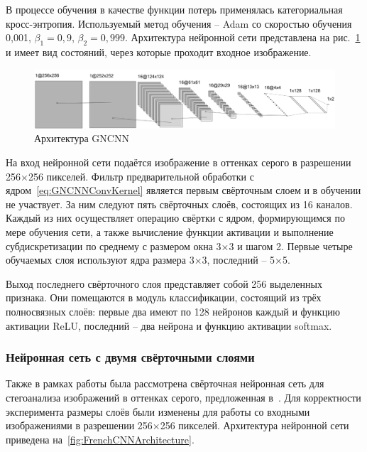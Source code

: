 В процессе обучения в качестве функции потерь применялась категориальная кросс-энтропия. Используемый метод обучения – Adam со скоростью обучения 0,001, $ \beta_1 = 0,9 $, $ \beta_2 = 0,999 $. Архитектура нейронной сети представлена на рис.~\ref{fig:GNCNNArchitecture} и имеет вид состояний, через которые проходит входное изображение.

\begin{figure}
\centering
\includegraphics[width=1\textwidth]{include/graphics/im_3-gncnn_architecture}
\caption{Архитектура GNCNN}
\label{fig:GNCNNArchitecture}
\end{figure}

На вход нейронной сети подаётся изображение в оттенках серого в разрешении 256×256 пикселей. Фильтр предварительной обработки с ядром~\eqref{eq:GNCNNConvKernel} является первым свёрточным слоем и в обучении не участвует. За ним следуют пять свёрточных слоёв, состоящих из 16 каналов. Каждый из них осуществляет операцию свёртки с ядром, формирующимся по мере обучения сети, а также вычисление функции активации и выполнение субдискретизации по среднему с размером окна 3×3 и шагом 2. Первые четыре обучаемых слоя используют ядра размера 3×3, последний – 5×5.

Выход последнего свёрточного слоя представляет собой 256 выделенных признака. Они помещаются в модуль классификации, состоящий из трёх полносвязных слоёв: первые два имеют по 128 нейронов каждый и функцию активации ReLU, последний – два нейрона и функцию активации softmax.

\subsubsection{Нейронная сеть с двумя свёрточными слоями}
Также в рамках работы была рассмотрена свёрточная нейронная сеть для стегоанализа изображений в оттенках серого, предложенная в~\cite{FrenchCNN}. Для корректности эксперимента размеры слоёв были изменены для работы со входными изображениями в разрешении 256×256 пикселей. Архитектура нейронной сети приведена на~\ref{fig:FrenchCNNArchitecture}.

